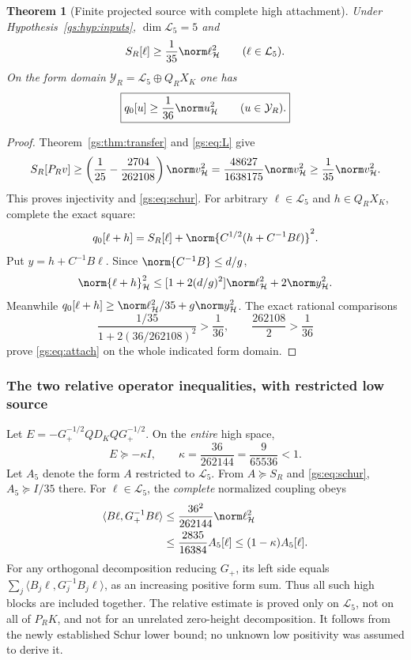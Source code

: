 \documentclass[11pt,a4paper]{article}
\numberwithin{equation}{section}
\newtheorem{theorem}{Theorem}[section]
\theoremstyle{definition}\newtheorem{definition}[theorem]{Definition}
\theoremstyle{remark}\newtheorem{remark}[theorem]{Remark}
\newcommand{\Hh}{\mathcal H}\newcommand{\Hw}{\mathcal H}
\begin{document}
\begin{theorem}[Finite projected source with complete high attachment]
Under Hypothesis~\ref{gs:hyp:inputs}, $\dim\mathcal L_5=5$ and
\begin{equation}\label{gs:eq:schur}
 S_R[\ell]\ge\frac1{35}\norm\ell_\Hh^2
 \qquad(\ell\in\mathcal L_5).
\end{equation}
On the form domain
$\mathcal Y_R=\mathcal L_5\oplus Q_RX_K$ one has
\begin{equation}\label{gs:eq:attach}
 \boxed{q_0[u]\ge\frac1{36}\norm u_\Hh^2\qquad(u\in\mathcal Y_R).}
\end{equation}
\end{theorem}
\begin{proof}
Theorem~\ref{gs:thm:transfer} and \eqref{gs:eq:L} give
\[
 S_R[P_Rv]\ge\left(\frac1{25}-\frac{2704}{262108}\right)\norm v_\Hh^2
 =\frac{48627}{1638175}\norm v_\Hh^2\ge
 \frac1{35}\norm v_\Hh^2.
\]
This proves injectivity and \eqref{gs:eq:schur}. For arbitrary
$\ell\in\mathcal L_5$ and $h\in Q_RX_K$, complete the exact square:
\[
 q_0[\ell+h]=S_R[\ell]+\norm{C^{1/2}(h+C^{-1}B\ell)}^2.
\]
Put $y=h+C^{-1}B\ell$. Since $\norm{C^{-1}B}\le d/g$,
\[
 \norm{\ell+h}_\Hh^2\le[1+2(d/g)^2]\norm\ell_\Hh^2+2\norm y_\Hh^2.
\]
Meanwhile $q_0[\ell+h]\ge\norm\ell_\Hh^2/35+g\norm y_\Hh^2$.
The exact rational comparisons
\[
 \frac{1/35}{1+2(36/262108)^2}>\frac1{36},\qquad
 \frac{262108}{2}>\frac1{36}
\]
prove \eqref{gs:eq:attach} on the whole indicated form domain.
\end{proof}

\subsubsection*{The two relative operator inequalities, with restricted low source}
Let $E=-G_+^{-1/2}QD_KQG_+^{-1/2}$. On the \emph{entire} high space,
\begin{equation}\label{gs:eq:E}
 E\succeq-\kappa I,\qquad\kappa=\frac{36}{262144}=\frac9{65536}<1.
\end{equation}
Let $A_5$ denote the form $A$ restricted to $\mathcal L_5$. From
$A\succeq S_R$ and \eqref{gs:eq:schur}, $A_5\succeq I/35$ there.
For $\ell\in\mathcal L_5$, the \emph{complete} normalized coupling obeys
\begin{align}
 \langle B\ell,G_+^{-1}B\ell\rangle
 &\le\frac{36^2}{262144}\norm\ell_\Hh^2\notag\\
 &\le\frac{2835}{16384}A_5[\ell]
 \le(1-\kappa)A_5[\ell].\label{gs:eq:relative}
\end{align}
For any orthogonal decomposition reducing $G_+$, its left side equals
$\sum_j\langle B_j\ell,G_j^{-1}B_j\ell\rangle$, as an increasing
positive form sum. Thus all such high blocks are included together.
The relative estimate is proved only on $\mathcal L_5$, not on all of
$P_RK$, and not for an unrelated zero-height decomposition.
It follows from the newly established Schur lower bound; no unknown
low positivity was assumed to derive it.
\end{document}
